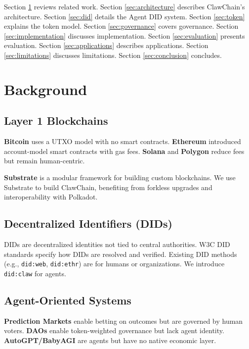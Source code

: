 \documentclass{article}
\begin{document}
Section \ref{sec:background} reviews related work. Section \ref{sec:architecture} describes ClawChain's architecture. Section \ref{sec:did} details the Agent DID system. Section \ref{sec:token} explains the token model. Section \ref{sec:governance} covers governance. Section \ref{sec:implementation} discusses implementation. Section \ref{sec:evaluation} presents evaluation. Section \ref{sec:applications} describes applications. Section \ref{sec:limitations} discusses limitations. Section \ref{sec:conclusion} concludes.

\section{Background}\label{sec:background}

\subsection{Layer 1 Blockchains}

\textbf{Bitcoin} \cite{bitcoin} uses a UTXO model with no smart contracts. \textbf{Ethereum} \cite{ethereum} introduced account-model smart contracts with gas fees. \textbf{Solana} \cite{solana} and \textbf{Polygon} \cite{polygon} reduce fees but remain human-centric.

\textbf{Substrate} \cite{substrate} is a modular framework for building custom blockchains. We use Substrate to build ClawChain, benefiting from forkless upgrades and interoperability with Polkadot.

\subsection{Decentralized Identifiers (DIDs)}

DIDs \cite{did} are decentralized identities not tied to central authorities. W3C DID standards \cite{w3c_did} specify how DIDs are resolved and verified. Existing DID methods (e.g., \texttt{did:web}, \texttt{did:ethr}) are for humans or organizations. We introduce \texttt{did:claw} for agents.

\subsection{Agent-Oriented Systems}

\textbf{Prediction Markets} \cite{polymarket} enable betting on outcomes but are governed by human voters. \textbf{DAOs} \cite{dao} enable token-weighted governance but lack agent identity. \textbf{AutoGPT/BabyAGI} are agents but have no native economic layer.
\end{document}
